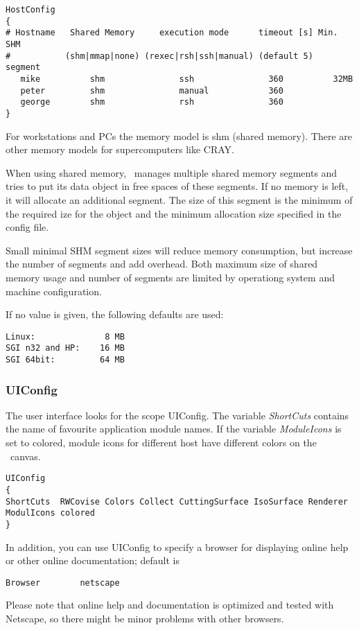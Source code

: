 \begin{verbatim}
HostConfig
{
# Hostname   Shared Memory     execution mode      timeout [s] Min. SHM
#           (shm|mmap|none) (rexec|rsh|ssh|manual) (default 5)  segment
   mike          shm               ssh               360          32MB
   peter         shm               manual            360
   george        shm               rsh               360
}
\end{verbatim}

For workstations and PCs the memory model is shm (shared memory). There
are other memory models for supercomputers like CRAY.

When using shared memory, \covise\ manages multiple shared memory segments
and tries to put its data object in free spaces of these segments. If no
memory is left, it will allocate an additional segment. The size of this
segment is the minimum of the required ize for the object and the minimum
allocation size specified in the config file.

Small minimal SHM segment sizes will reduce memory consumption, but increase
the number of segments and add overhead. Both maximum size of shared memory
usage and number of segments are limited by operationg system and machine
configuration.

If no value is given, the following defaults are used:

\begin{verbatim}
Linux:              8 MB
SGI n32 and HP:    16 MB
SGI 64bit:         64 MB
\end{verbatim}

\subsubsection{UIConfig}
The user interface looks for the scope UIConfig. The variable {\it ShortCuts} contains the name
of favourite application module names. If the variable {\it ModuleIcons} is set to colored, module icons
for different host have different colors on the \mapeditor\ canvas.

\begin{verbatim}
UIConfig
{
ShortCuts  RWCovise Colors Collect CuttingSurface IsoSurface Renderer
ModulIcons colored
}
\end{verbatim}

In addition, you can use UIConfig to specify a browser for displaying online help or other
online documentation; default is  
\begin{verbatim}
Browser        netscape
\end{verbatim}
Please note that online help and documentation is optimized and tested with Netscape, so there
might be minor problems with other browsers.

